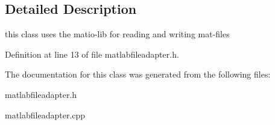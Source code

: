 \subsection{Detailed Description}
this class uses the matio-\/lib for reading and writing mat-\/files 

Definition at line 13 of file matlabfileadapter.\-h.



The documentation for this class was generated from the following files\-:\begin{DoxyCompactItemize}
\item 
matlabfileadapter.\-h\item 
matlabfileadapter.\-cpp\end{DoxyCompactItemize}
